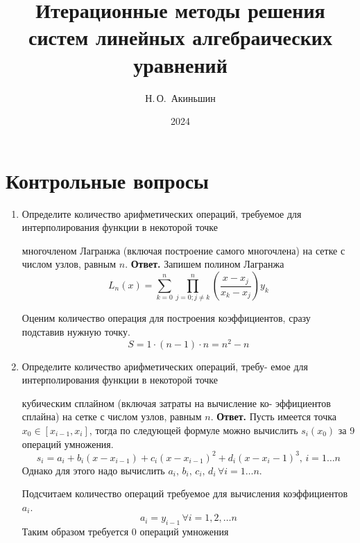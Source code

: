 \documentclass{article}
\title{Итерационные методы решения систем
линейных алгебраических уравнений}
\author{Н.\,О.~Акиньшин}
\date{2024}
\begin{document}
    \maketitle
    \newpage
    \tableofcontents
    \newpage

    \section{Контрольные вопросы}
    \begin{enumerate}
        \item Определите количество арифметических операций, требуемое для интерполирования функции в некоторой точке
        
        многочленом Лагранжа (включая построение самого многочлена) на сетке с числом узлов, равным $n$.
        \newline 
        {\bfseries Ответ. } 
        Запишем полином Лагранжа
        \begin{equation*}
            L_n(x) = \sum_{k=0}^{n} \prod_{j=0; j\neq k}^{n} \left(\dfrac{x-x_j}{x_k-x_j}\right) y_k 
        \end{equation*}

        Оценим количество операция для построения коэффициентов, сразу подставив 
        нужную точку. 
        \begin{equation*}
            S = 1 \cdot (n-1) \cdot n = n^2 - n
        \end{equation*}

        \item  Определите количество арифметических операций, требу-
        емое для интерполирования функции в некоторой точке
        
        кубическим сплайном (включая затраты на вычисление ко-
        эффициентов сплайна) на сетке с числом узлов, равным $n$.
        \newline
        {\bfseries Ответ. } Пусть имеется точка $x_0 \in [x_{i-1}, x_{i}]$, тогда по следующей формуле можно вычислить $s_i(x_0)$ за 9 операций умножения.
        \[
        s_i=a_i+b_i(x-x_{i-1})+c_i(x-x_{i-1})^2+d_i(x-x_i-1)^3, \, i=1\ldots n
        \]
        Однако для этого надо вычислить $a_i, \, b_i, \, c_i, \, d_i \, \forall i=1 \ldots n$.
        
        
        \noindent Подсчитаем количество операций требуемое для вычисления коэффициентов $a_i$. 
        \[
        a_i=y_{i-1} \, \forall i=1,2, \ldots n
        \]
        Таким образом требуется 0 операций умножения
        

\end{enumerate}
\end{document}
